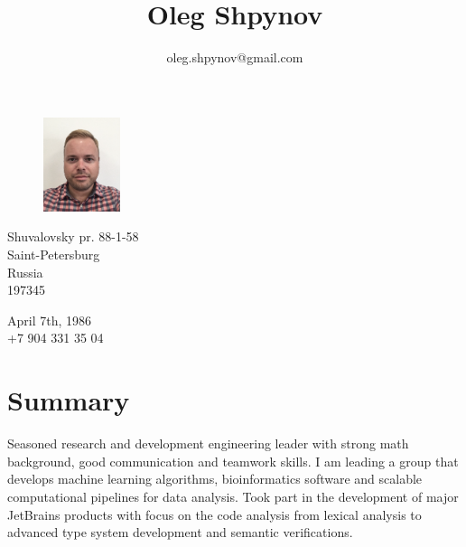 \documentclass[11pt]{article}
\title{\bfseries\Huge Oleg Shpynov}
\author{oleg.shpynov@gmail.com}
\date{}
\begin{document}
\begin{figure}
    \vspace*{-4cm} %
	\hfill\includegraphics[width=0.20\textwidth]{me2020.png}
    \vspace*{-4cm} %
\end{figure}

\maketitle 

\begin{minipage}[ht]{0.4\textwidth}
Shuvalovsky pr. 88-1-58\\
Saint-Petersburg\\
Russia\\
197345
\end{minipage}
\begin{minipage}[ht]{0.3\textwidth}
April 7th, 1986\\
+7 904 331 35 04
\end{minipage}
\vspace{10pt}

\section*{Summary}
Seasoned research and development engineering leader with strong math background, good communication and teamwork skills. I am leading a group that develops machine learning algorithms, bioinformatics software and scalable computational  pipelines for data analysis. Took part in the development of major JetBrains products with focus on the code analysis from lexical analysis to advanced type system development and semantic verifications.
\end{document}
